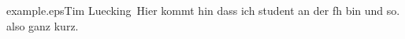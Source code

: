 


%
%

\begin{authorbiography}{example.eps}{Tim Luecking}\
Hier kommt hin dass ich student an der fh bin und so. 
also ganz kurz.
\end{authorbiography}


